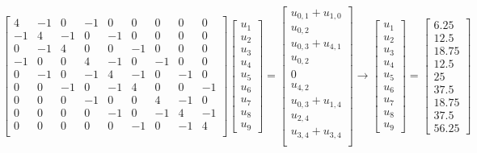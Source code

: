 \documentclass[9pt, aspectratio=169]{beamer}
\begin{document}
\begin{frame}
\[
    \begin{bmatrix}
        4 & -1 & 0 & -1 & 0 & 0 & 0 & 0 & 0 \\
        -1 & 4 & -1 & 0 & -1 & 0 & 0 & 0 & 0  \\
        0 & -1 & 4 & 0 & 0 & -1 & 0 & 0 & 0  \\
        -1 & 0 & 0 & 4 & -1 & 0 & -1 & 0 & 0 \\
        0 & -1 & 0 & -1 & 4 & -1 & 0 & -1 & 0 \\
        0 & 0 & -1 & 0 & -1 & 4 & 0 & 0 & -1 \\
        0 & 0 & 0 & -1 & 0 & 0 & 4 & -1 & 0  \\
        0 & 0 & 0 & 0 & -1 & 0 & -1 & 4 & -1  \\
        0 & 0 & 0 & 0 & 0 & -1 & 0 & -1 & 4  \\
    \end{bmatrix}
    \begin{bmatrix} u_1 \\ u_2 \\ u_3 \\ u_4 \\ u_5 \\ u_6 \\ u_7 \\ u_8 \\ u_9 \end{bmatrix} = 
    \begin{bmatrix}
        u_{0,1} + u_{1,0} \\
        u_{0,2} \\
        u_{0,3} + u_{4,1} \\
        u_{0,2} \\
        0 \\
        u_{4,2} \\
        u_{0,3} + u_{1,4} \\
        u_{2,4} \\
        u_{3,4} + u_{3,4} \\
    \end{bmatrix} \rightarrow
    \begin{bmatrix} u_1 \\ u_2 \\ u_3 \\ u_4 \\ u_5 \\ u_6 \\ u_7 \\ u_8 \\ u_9 \end{bmatrix} = 
    \begin{bmatrix} 6.25 \\ 12.5 \\ 18.75 \\ 12.5 \\ 25 \\ 37.5 \\ 18.75 \\ 37.5 \\ 56.25 \end{bmatrix}
\] \pause


\end{frame}
\end{document}
